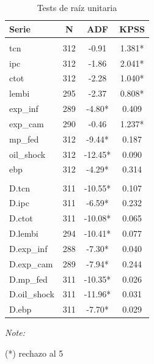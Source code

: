 \begin{table}[!h]
\centering
\caption{Tests de raíz unitaria}
\centering
\begin{threeparttable}
\begin{tabular}[t]{lccc}
\toprule
Serie & N & ADF & KPSS\\
\midrule
\addlinespace[0.3em]
\multicolumn{4}{l}{\textbf{Niveles}}\\
\hspace{1em}tcn & 312 & -0.91 & 1.381*\\
\hspace{1em}ipc & 312 & -1.86 & 2.041*\\
\hspace{1em}ctot & 312 & -2.28 & 1.040*\\
\hspace{1em}lembi & 295 & -2.37 & 0.808*\\
\hspace{1em}exp\_inf & 289 & -4.80* & 0.409\\
\hspace{1em}exp\_cam & 290 & -0.46 & 1.237*\\
\hspace{1em}mp\_fed & 312 & -9.44* & 0.187\\
\hspace{1em}oil\_shock & 312 & -12.45* & 0.090\\
\hspace{1em}ebp & 312 & -4.29* & 0.314\\
\addlinespace[0.3em]
\multicolumn{4}{l}{\textbf{Primeras diferencias}}\\
\hspace{1em}D.tcn & 311 & -10.55* & 0.107\\
\hspace{1em}D.ipc & 311 & -6.59* & 0.232\\
\hspace{1em}D.ctot & 311 & -10.08* & 0.065\\
\hspace{1em}D.lembi & 294 & -10.41* & 0.077\\
\hspace{1em}D.exp\_inf & 288 & -7.30* & 0.040\\
\hspace{1em}D.exp\_cam & 289 & -7.94* & 0.244\\
\hspace{1em}D.mp\_fed & 311 & -10.35* & 0.026\\
\hspace{1em}D.oil\_shock & 311 & -11.96* & 0.031\\
\hspace{1em}D.ebp & 311 & -7.70* & 0.029\\
\bottomrule
\end{tabular}
\begin{tablenotes}
\item \textit{Note: } 
\item (*) rechazo al 5%
\end{tablenotes}
\end{threeparttable}
\end{table}